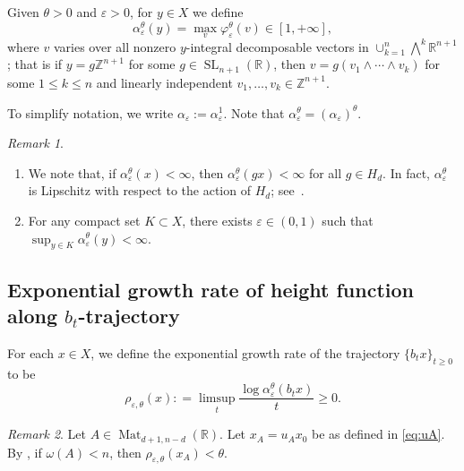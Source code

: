 \documentclass[12pt,reqno]{amsart}
\newcommand{\SL}{\operatorname{SL}}
\newcommand{\defeq}{\mathrel{\mathop:}=}
\numberwithin{equation}{section}
\theoremstyle{plain}
\theoremstyle{definition}
\theoremstyle{remark}
\newtheorem{remark}{Remark}[section]
\newcommand\bbR{\mathbb{R}}
\newcommand{\R}{\mathbb{R}}
\newcommand{\Z}{\mathbb{Z}}
\newcommand{\eps}{\varepsilon}
\DeclareMathOperator{\Mat}{Mat}
\begin{document}
	Given $\theta>0$ and $\eps>0$, for $y\in X$ we define
	\begin{equation}\label{eq:alpha_eps^theta}
	\alpha_\eps^{\theta}(y)=\max_v \varphi_\eps^\theta(v)\in [1,+\infty],
	\end{equation}
	where $v$ varies over all nonzero $y$-integral decomposable vectors in        $\cup_{k=1}^{n}\bigwedge^k\bbR^{n+1}$; that is if $y=g\Z^{n+1}$ for some $g\in\SL_{n+1}(\R)$, then $v=g(v_1\wedge \cdots \wedge v_k)$ for some $1\leq k\leq n$ and linearly independent $v_1,\ldots,v_k\in\Z^{n+1}$. 

    To simplify notation, we write $\alpha_\eps:=\alpha_\eps^1$. Note that $\alpha_\eps^\theta=(\alpha_\eps)^\theta$.
    
    \begin{remark} \label{rem:alpha-eps}
        \begin{enumerate}
            \item 
        We note that, if $\alpha_\eps^\theta(x)<\infty$, then $\alpha_\eps^\theta(gx)<\infty$ for all $g\in H_d$. In fact, $\alpha_\eps^\theta$ is Lipschitz with respect to the action of $H_d$; see~\cite[Lemma 4.1]{Shi20}.


\item For any compact set $K\subset X$, there exists $\eps\in(0,1)$ such that $\sup_{y\in K}\alpha_\eps^\theta(y)<\infty$.
 \end{enumerate}

    \end{remark}
    
    
	
	
    
\subsection{Exponential growth rate of height function along \texorpdfstring{$b_t$}{b\_t}-trajectory}

	For each $x\in X$, 
    we define the exponential growth rate of the trajectory $\{b_tx\}_{t\geq0}$ to be
	\begin{equation} \label{eq:definition of rho}
    \rho_{\eps,\theta}(x)\defeq  \limsup_{t}\frac{\log \alpha^\theta_\eps(b_tx)}{t}\geq 0.
	\end{equation}

\begin{remark}
  \label{rem:rhoxA}
     Let $A\in\Mat_{d+1,n-d}(\R)$. Let $x_A=u_Ax_0$ be as defined in \eqref{eq:uA}. By \cite[Proposition 4.1]{SY24TAMS}, if $\omega(A)<n$, then $\rho_{\eps,\theta}(x_A)<\theta$.   
\end{remark}
    
\end{document}
